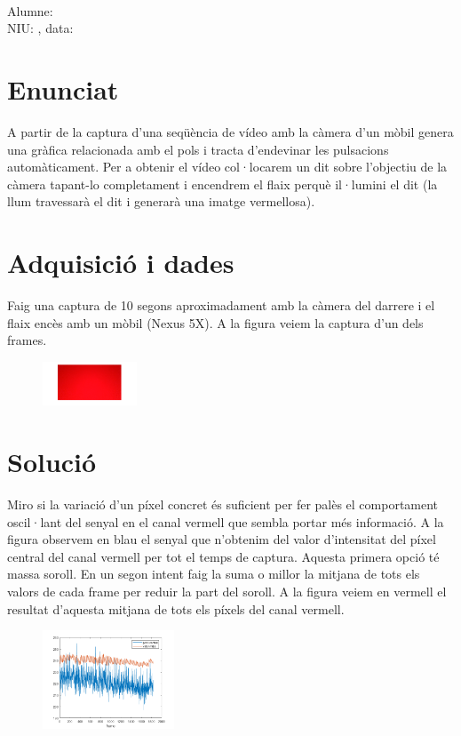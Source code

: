 \documentclass[a4paper,10pt,twocolumn]{article}
\begin{document}
\\ 
Alumne: \\
NIU: \hspace{2cm}, data:  \\


\section{Enunciat}
A partir de la captura d'una seqüència de vídeo amb la càmera d'un mòbil genera una gràfica relacionada amb el pols i tracta d'endevinar les pulsacions automàticament.
Per a obtenir el vídeo col·locarem un dit sobre l'objectiu de la càmera tapant-lo completament i encendrem el flaix perquè il·lumini el dit (la llum travessarà el dit i generarà una imatge vermellosa).


\section{Adquisició i dades}
Faig una captura de 10 segons aproximadament amb la càmera del darrere i el flaix encès amb un mòbil (Nexus 5X).
A la figura veiem la captura d'un dels frames.
\begin{figure}[h]
\centering
\includegraphics[width=0.25\textwidth]{fig1.png} 
\end{figure}


\section{Solució}
Miro si la variació d'un píxel concret és suficient per fer palès el comportament oscil·lant del senyal en el canal vermell que sembla portar més informació. A la figura observem en blau el senyal que n'obtenim del valor d'intensitat del píxel central del canal vermell per tot el temps de captura.
Aquesta primera opció té massa soroll. En un segon intent faig la suma o millor la mitjana de tots els valors de cada frame per reduir la part del soroll. A la figura veiem en vermell el resultat d'aquesta mitjana de tots els píxels del canal vermell.
\begin{figure}[h]
\centering
\includegraphics[width=0.35\textwidth]{fig2.png} 
\end{figure}
\end{document}
